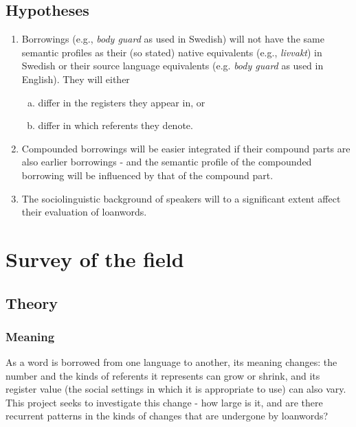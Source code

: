 \documentclass[a4paper]{article}
\begin{document}
\subsection{Hypotheses}
\begin{enumerate}
	\item Borrowings (e.g., \emph{body guard} as used in Swedish) will not have the same semantic profiles as their (so stated) native equivalents (e.g., \emph{livvakt}) in Swedish or their source language equivalents (e.g. \emph{body guard} as used in English).
	They will either
	\begin{enumerate}[a)]
		\item differ in the registers they appear in, or
		\item differ in which referents they denote.
	\end{enumerate}
	\item Compounded borrowings will be easier integrated if their compound parts are also earlier borrowings - and the semantic profile of the compounded borrowing will be influenced by that of the compound part.
	\item The sociolinguistic background of speakers will to a significant extent affect their evaluation of loanwords.
\end{enumerate}



\section{Survey of the field}


\subsection{Theory}

\subsubsection{Meaning}
\label{sect_meaning}

As a word is borrowed from one language to another, its meaning changes: the number and the kinds of referents it represents can grow or shrink, and its register value (the social settings in which it is appropriate to use) can also vary. This project seeks to investigate this change - how large is it, and are there recurrent patterns in the kinds of changes that are undergone by loanwords?
\end{document}
